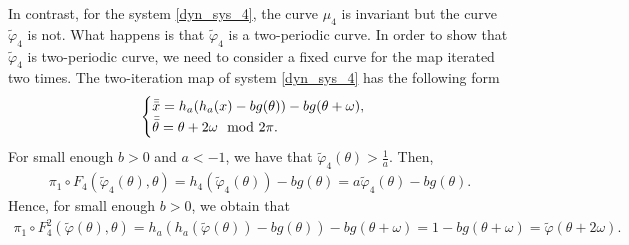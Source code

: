 \documentclass[12pt]{article}
\theoremstyle{plain}
\theoremstyle{remark}
\theoremstyle{definition}
\begin{document}
In contrast, for the system \eqref{dyn_sys_4}, the curve $\mu_4$ is invariant but the curve $\tilde\varphi_4$ is not. What happens is that $\tilde\varphi_4$ is a two-periodic curve. In order to show that $\tilde\varphi_4$ is two-periodic curve, we need to consider a fixed curve for the map iterated two times. The two-iteration map of system \eqref{dyn_sys_4} has the following form
\begin{align}\label{dyn_sys_4_two}
    \begin{cases}
        \Bar{\Bar{x}} = h_a(h_{a}(x) - b g(\theta)) - b g(\theta+\omega),\\
        \Bar{\Bar{\theta}} = \theta + 2\omega \mod2\pi.
    \end{cases}
\end{align}
For small enough $b>0$ and $a<-1$, we have that $\tilde\varphi_4(\theta)>\frac{1}{a}$. Then,
\begin{align*}
    \pi_1\circ F_4(\tilde\varphi_4(\theta),\theta) = h_{4}(\tilde\varphi_4(\theta)) - b g(\theta) = a\tilde\varphi_4(\theta) - b g(\theta).
\end{align*}
Hence, for small enough $b>0$, we obtain that
\begin{align*}
    \pi_1\circ F_4^2(\tilde\varphi(\theta),\theta) = h_a(h_{a}(\tilde\varphi(\theta)) - b g(\theta)) - b g(\theta+\omega) = 1 - b g(\theta+\omega) = \tilde\varphi(\theta+2\omega).
\end{align*}
\end{document}

